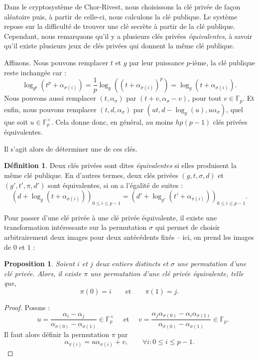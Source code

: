 \documentclass[a4paper, titlepage, 11pt]{article}
\newtheorem{prop}[theo]{Proposition}
\theoremstyle{definition}
\newtheorem{defi}[theo]{Définition}
\theoremstyle{remark}
\def\gf #1{\mathbb{F}_{#1}}
\begin{document}
Dans le cryptosystème de Chor-Rivest, nous choisissons la clé privée de façon aléatoire puis, à partir de celle-ci, nous calculons la clé publique. Le système repose sur la difficulté de trouver une clé secrète à partir de la clé publique. Cependant, nous remarquons qu'il y a plusieurs clés privées \textit{équivalentes}, à savoir qu'il existe plusieurs jeux de clés privées qui donnent la même clé publique.

Affinons. Nous pouvons remplacer $t$ et $g$ par leur puissance $p$-ième, la clé publique reste inchangée car :
$$\log_{g^p}\left(t^p + \alpha_{\sigma(i)}\right) = \frac{1}{p}\log_{g}\left(\left(t + \alpha_{\sigma(i)}\right)^p\right) = \log_{g}\left(t + \alpha_{\sigma(i)}\right).$$
Nous pouvons aussi remplacer $(t, \alpha_{\sigma})$ par $(t + v, \alpha_{\sigma} - v)$, pour tout $v \in \gf{p}$. Et enfin, nous pouvons remplacer $(t,d,\alpha_\sigma)$ par $(ut, d - \log_g(u), u\alpha_\sigma)$, quel que soit $u \in \gf{p}^\times$.
Cela donne donc, en général, au moins $hp(p-1)$ clés privées équivalentes.

Il s'agit alors de déterminer une de ces clés.


\begin{defi}
Deux clés privées sont dites \textit{équivalentes} si elles produisent la même clé publique. En d'autres termes, deux clés privées $(g,t,\sigma,d)$ et $(g',t',\pi ,d')$ sont équivalentes, si on a l'égalité de suites :
$$\left(d + \log_g(t + \alpha_{\sigma(i)})\right)_{0\leqslant i \leqslant p-1} = \left(d' + \log_{g'}(t' + \alpha_{\pi(i)})\right)_{0\leqslant i \leqslant p-1}.$$
\end{defi}

Pour passer d'une clé privée à une clé privée équivalente, il existe une transformation intéressante sur la permutation $\sigma$ qui permet de choisir arbitrairement deux images pour deux antécédents fixés -- ici, on prend les images de $0$ et $1$ :

\begin{prop}\label{prop:permutation}
Soient $i$ et $j$ deux entiers distincts et $\sigma$ une permutation d'une clé privée. Alors, il existe $\pi$ une permutation d'une clé privée équivalente, telle que, $$\pi(0) = i \qquad \text{et}\qquad \pi(1) = j.$$
\end{prop}

\begin{proof}
Posons :
$$\quad u = \frac{\alpha_i - \alpha_j}{\alpha_{\sigma(0)}- \alpha_{\sigma(1)}} \in \gf{p}^\times \quad \text{ et } \quad v =  \frac{\alpha_j\alpha_{\sigma(0)} - \alpha_i\alpha_{\sigma(1)}}{\alpha_{\sigma(0)}- \alpha_{\sigma(1)}} \in \gf{p}.$$
Il faut alors définir la permutation $\pi$ par
$$\alpha_{\pi(i)} = u\alpha_{\sigma(i)} + v,\qquad \forall i : 0\leqslant i \leqslant p-1.$$
\end{proof}
\end{document}
